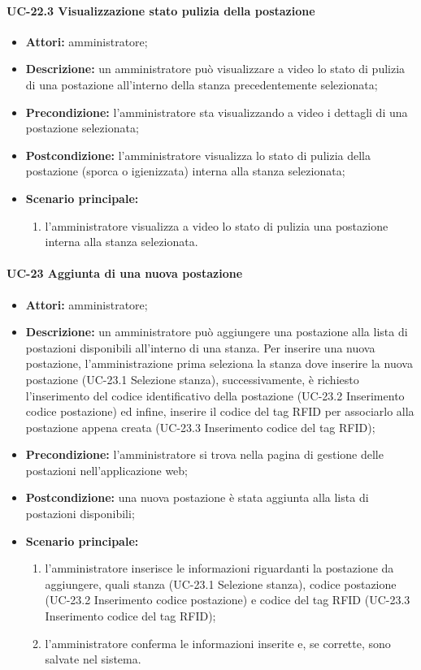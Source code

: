 \paragraph{UC-22.3 Visualizzazione stato pulizia della postazione} 
\begin{itemize}
    \item \textbf{Attori:} amministratore;
    \item \textbf{Descrizione:} un amministratore pu\`{o} visualizzare a video lo stato di pulizia di una postazione all'interno della stanza precedentemente selezionata;
    \item \textbf{Precondizione:} l'amministratore sta visualizzando a video i dettagli di una postazione selezionata;
    \item \textbf{Postcondizione:} l'amministratore visualizza lo stato di pulizia della postazione (sporca o igienizzata) interna alla stanza selezionata;
    \item \textbf{Scenario principale:}
    \begin{enumerate}
        \item l'amministratore visualizza a video lo stato di pulizia una postazione interna alla stanza selezionata.
    \end{enumerate}
\end{itemize}

\paragraph{UC-23 Aggiunta di una nuova postazione}
\begin{itemize}
    \item \textbf{Attori:} amministratore;
    \item \textbf{Descrizione:} un amministratore pu\`{o} aggiungere una postazione alla lista di postazioni disponibili all'interno di una stanza. Per inserire una nuova postazione, l'amministrazione prima seleziona la stanza dove inserire la nuova postazione (UC-23.1 Selezione stanza), successivamente, è richiesto l'inserimento del codice identificativo della postazione (UC-23.2 Inserimento codice postazione) ed infine, inserire il codice del tag RFID per associarlo alla postazione appena creata (UC-23.3 Inserimento codice del tag RFID);
    \item \textbf{Precondizione:} l'amministratore si trova nella pagina di gestione delle postazioni nell'applicazione web;
    \item \textbf{Postcondizione:} una nuova postazione \`{e} stata aggiunta alla lista di postazioni disponibili;
    \item \textbf{Scenario principale:}
    \begin{enumerate}
        \item l'amministratore inserisce le informazioni riguardanti la postazione da aggiungere, quali stanza (UC-23.1 Selezione stanza), codice postazione (UC-23.2 Inserimento codice postazione) e codice del tag RFID (UC-23.3 Inserimento codice del tag RFID);
        \item l'amministratore conferma le informazioni inserite e, se corrette, sono salvate nel sistema.
    \end{enumerate}
\end{itemize}

